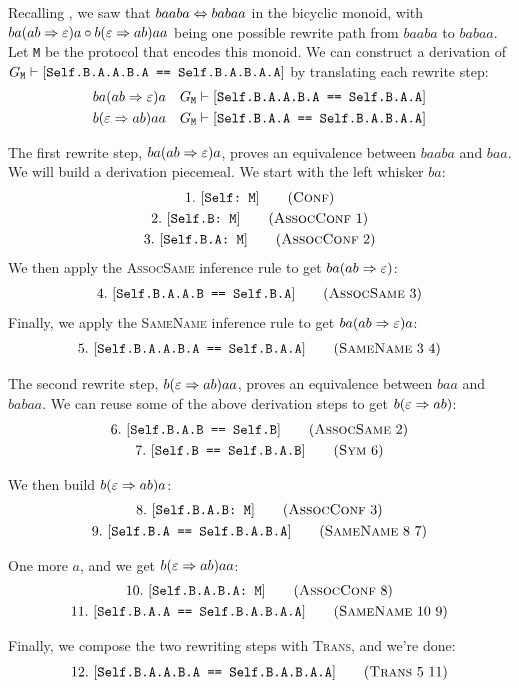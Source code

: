 \documentclass[../generics]{subfiles}
\begin{document}
\begin{example}
Recalling , we saw that $baaba\Leftrightarrow babaa$ in the bicyclic monoid, with $ba(ab\Rightarrow\varepsilon) a \circ b(\varepsilon\Rightarrow ab) aa$ being one possible rewrite path from $baaba$ to $babaa$. Let \texttt{M} be the protocol that encodes this monoid. We can construct a derivation of $G_\texttt{M}\vdash[\texttt{Self.B.A.A.B.A == Self.B.A.B.A.A}]$ by translating each rewrite step:
\begin{align*}
&ba(ab\Rightarrow\varepsilon) a&&G_\texttt{M}\vdash[\texttt{Self.B.A.A.B.A == Self.B.A.A}]\\
&b(\varepsilon\Rightarrow ab) aa&&G_\texttt{M}\vdash[\texttt{Self.B.A.A == Self.B.A.B.A.A}]
\end{align*}

The first rewrite step, $ba(ab\Rightarrow\varepsilon) a$, proves an equivalence between $baaba$ and $baa$. We will build a derivation piecemeal. We start with the left whisker $ba$:
\begin{gather*}
\ConfStep{Self}{M}{1}\\
\AssocConfStep{1}{Self.B}{M}{2}\\
\AssocConfStep{2}{Self.B.A}{M}{3}
\end{gather*}
We then apply the \textsc{AssocSame} inference rule to get $ba(ab\Rightarrow\varepsilon)$:
\begin{gather*}
\AssocSameStep{3}{Self.B.A.A.B}{Self.B.A}{4}
\end{gather*}
Finally, we apply the \textsc{SameName} inference rule to get $ba(ab\Rightarrow\varepsilon) a$:
\begin{gather*}
\SameNameStep{3}{4}{Self.B.A.A.B.A}{Self.B.A.A}{5}
\end{gather*}

The second rewrite step, $b(\varepsilon\Rightarrow ab) aa$, proves an equivalence between $baa$ and $babaa$. We can reuse some of the above derivation steps to get $b(\varepsilon\Rightarrow ab)$:
\begin{gather*}
\AssocSameStep{2}{Self.B.A.B}{Self.B}{6}\\
\SymStep{6}{Self.B}{Self.B.A.B}{7}
\end{gather*}

We then build $b(\varepsilon\Rightarrow ab) a$:
\begin{gather*}
\AssocConfStep{3}{Self.B.A.B}{M}{8}\\
\SameNameStep{8}{7}{Self.B.A}{Self.B.A.B.A}{9}
\end{gather*}

One more $a$, and we get $b(\varepsilon\Rightarrow ab) aa$:
\begin{gather*}
\AssocConfStep{8}{Self.B.A.B.A}{M}{10}\\
\SameNameStep{10}{9}{Self.B.A.A}{Self.B.A.B.A.A}{11}
\end{gather*}

Finally, we compose the two rewriting steps with \textsc{Trans}, and we're done:
\begin{gather*}
\TransStep{5}{11}{Self.B.A.A.B.A}{Self.B.A.B.A.A}{12}
\end{gather*}
\end{example}
\end{document}

